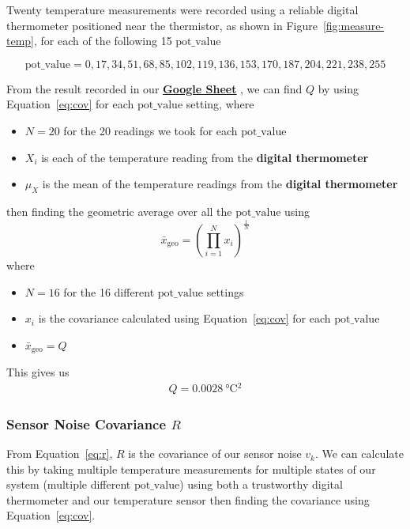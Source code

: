 \documentclass[12pt,a4paper]{article}
\begin{document}
Twenty temperature measurements were recorded using a reliable digital thermometer positioned near the thermistor, as shown in Figure~\ref{fig:measure-temp}, for each of the following 15 $\text{pot\_value}$

\begin{equation}
    \label{eq:pot-value}
    \text{pot\_value} = 0, 17, 34, 51, 68, 85, 102, 119, 136, 153, 170, 187, 204, 221, 238, 255
\end{equation}

From the result recorded in our \href{https://docs.google.com/spreadsheets/d/1mIqAQL7zom7rqrgY63SVOOFBYus10Tk0CKpmR08Oij0/edit?gid=0#gid=0}{\textbf{\underline{Google Sheet}}}
, we can find $Q$ by using Equation~\eqref{eq:cov} for each $\text{pot\_value}$ setting, where 

\begin{itemize}
    \item $N=20$ for the 20 readings we took for each $\text{pot\_value}$
    \item $X_i$ is each of the temperature reading from the \textbf{digital thermometer}
    \item $\mu_X$ is the mean of the temperature readings from the \textbf{digital thermometer}
\end{itemize}
then finding the geometric average over all the $\text{pot\_value}$ using
\begin{equation}
    \label{eq:geo-avg}
    \bar{x}_{\mathrm{geo}} = \left( \prod_{i=1}^{N} x_i \right)^{\tfrac{1}{N}}
\end{equation}
where
\begin{itemize}
    \item $N=16$ for the 16 different $\text{pot\_value}$ settings
    \item $x_i$ is the covariance calculated using Equation~\eqref{eq:cov} for each $\text{pot\_value}$
    \item $\bar{x}_{\mathrm{geo}}=Q$
\end{itemize}
This gives us
\begin{align*}
    Q = \SI{0.0028}{\degreeCelsius^2}
\end{align*}

\subsubsection{Sensor Noise Covariance $R$}
From Equation~\eqref{eq:r}, $R$ is the covariance of our sensor noise $v_k$. We can calculate this by taking multiple temperature measurements for multiple states of our system (multiple different $\text{pot\_value}$) using both a trustworthy digital thermometer and our temperature sensor then finding the covariance using Equation~\eqref{eq:cov}.
\end{document}
